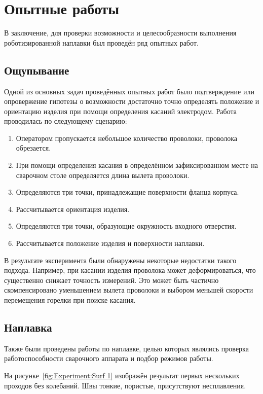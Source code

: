\chapter{Опытные работы}
В заключение, для проверки возможности и целесообразности выполнения роботизированной наплавки был проведён ряд опытных работ.


\section{Ощупывание}
Одной из основных задач проведённых опытных работ было подтверждение или опровержение гипотезы о возможности достаточно точно определять положение и ориентацию изделия при помощи определения касаний электродом.
Работа проводилась по следующему сценарию:

\begin{enumerate}
    \item Оператором пропускается небольшое количество проволоки, проволока обрезается.
    \item При помощи определения касания в определённом зафиксированном месте на сварочном столе определяется длина вылета проволоки.
    \item Определяются три точки, принадлежащие поверхности фланца корпуса.
    \item Рассчитывается ориентация изделия.
    \item Определяются три точки, образующие окружность входного отверстия.
    \item Рассчитывается положение изделия и поверхности наплавки.
\end{enumerate}

В результате эксперимента были обнаружены некоторые недостатки такого подхода.
Например, при касании изделия проволока может деформироваться, что существенно снижает точность измерений.
Это может быть частично скомпенсировано уменьшением вылета проволоки и выбором меньшей скорости перемещения горелки при поиске касания.


\section{Наплавка}
Также были проведены работы по наплавке, целью которых являлись проверка работоспособности сварочного аппарата и подбор режимов работы.

На рисунке~\ref{fig:Experiment:Surf 1} изображён результат первых нескольких проходов без колебаний.
Швы тонкие, пористые, присутствуют несплавления.

